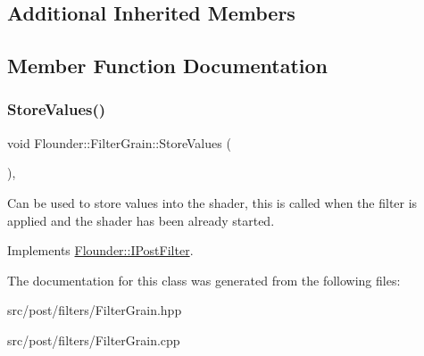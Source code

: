 \subsection*{Additional Inherited Members}


\subsection{Member Function Documentation}
\mbox{\label{class_flounder_1_1_filter_grain_a5cf7471f57b7a64c47bfe8a8b8f6dd01}} 
\subsubsection{\texorpdfstring{Store\+Values()}{StoreValues()}}
{\footnotesize\ttfamily void Flounder\+::\+Filter\+Grain\+::\+Store\+Values (\begin{DoxyParamCaption}{ }\end{DoxyParamCaption})\hspace{0.3cm}{\ttfamily [override]}, {\ttfamily [virtual]}}



Can be used to store values into the shader, this is called when the filter is applied and the shader has been already started. 



Implements \hyperlink{class_flounder_1_1_i_post_filter_a20420ec0a9bac67437740552bea9ab74}{Flounder\+::\+I\+Post\+Filter}.



The documentation for this class was generated from the following files\+:\begin{DoxyCompactItemize}
\item 
src/post/filters/Filter\+Grain.\+hpp\item 
src/post/filters/Filter\+Grain.\+cpp\end{DoxyCompactItemize}
